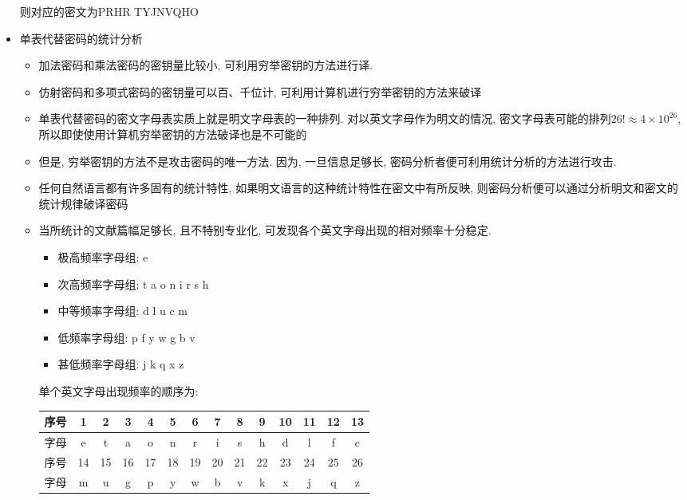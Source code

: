 \documentclass[UTF8]{ctexart}
\begin{document}
\begin{itemize}
        则对应的密文为PRHR TYJNVQHO

        \item 单表代替密码的统计分析
        \begin{itemize}
            \item 加法密码和乘法密码的密钥量比较小, 可利用穷举密钥的方法进行译.
            \item 仿射密码和多项式密码的密钥量可以百、千位计, 可利用计算机进行穷举密钥的方法来破译
            \item 单表代替密码的密文字母表实质上就是明文字母表的一种排列. 对以英文字母作为明文的情况, 密文字母表可能的排列$26!\approx 4\times 10^{26}$, 所以即使使用计算机穷举密钥的方法破译也是不可能的
            \item 但是, 穷举密钥的方法不是攻击密码的唯一方法. 因为, 一旦信息足够长, 密码分析者便可利用统计分析的方法进行攻击.
            \item 任何自然语言都有许多固有的统计特性, 如果明文语言的这种统计特性在密文中有所反映, 则密码分析便可以通过分析明文和密文的统计规律破译密码
            \item 当所统计的文献篇幅足够长, 且不特别专业化, 可发现各个英文字母出现的相对频率十分稳定.
            \begin{itemize}
                \item 极高频率字母组: e
                \item 次高频率字母组: t a o n i r s h
                \item 中等频率字母组: d l u c m
                \item 低频率字母组: p f y w g b v
                \item 甚低频率字母组: j k q x z
            \end{itemize}

            单个英文字母出现频率的顺序为:

            \begin{tabular}{|c|c|c|c|c|c|c|c|c|c|c|c|c|c|}
                \hline
                序号 &1 &2 &3 &4 &5 &6 &7 &8 &9 &10 &11 &12 &13\\
                \hline
                字母 &e &t &a &o &n &r &i &s &h &d &l &f &c\\
                \hline
                \hline
                序号 &14 &15 &16 &17 &18 &19 &20 &21 &22 &23 &24 &25 &26\\
                \hline
                字母 &m &u &g &p &y &w &b &v &k &x &j &q &z\\
                \hline
            \end{tabular}
        \end{itemize}



\end{itemize}
\end{document}
